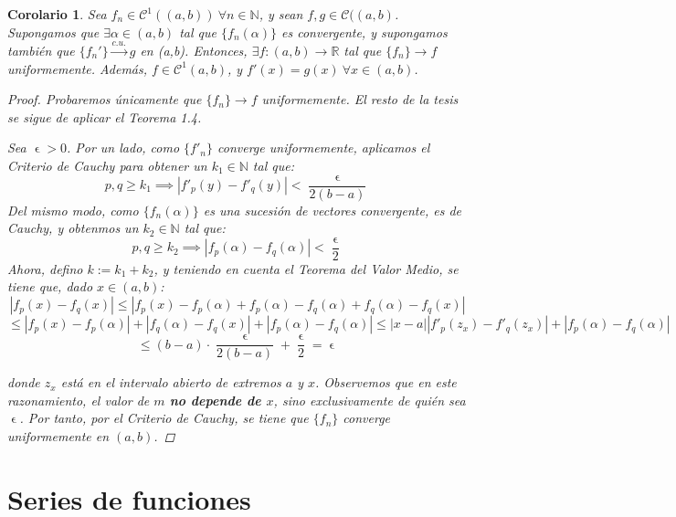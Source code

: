 \documentclass[11pt, a4paper]{article}
\let\epsilon\upvarepsilon
\newcommand{\fn}{\{f_n\}}
\theoremstyle{theorem-style}
\newtheorem{ncor}{Corolario}[section]
\theoremstyle{definition-style}
\theoremstyle{remark-style}
\theoremstyle{example-style}
\begin{document}
\begin{ncor}
	Sea $f_n\in \mathcal{C}^1((a,b)) \ \forall n \in \mathbb{N}$, y sean $f,g \in \mathcal{C}((a,b)$. Supongamos que $\exists \alpha \in (a,b)$ tal que $ \{f_n(\alpha)\}$ es convergente, y supongamos también que $\{f_n'\} \xrightarrow{c.u.} g $ en (a,b). Entonces, $\exists f: (a,b) \to \mathbb{R}$ tal que $\fn \to f$ uniformemente. Además, $f \in \mathcal{C}^1(a,b)$, y  $f'(x) = g(x)\ \forall x \in (a,b)$.

\begin{proof}
	Probaremos únicamente que $\fn \to f$ uniformemente. El resto de la tesis se sigue de aplicar el \textit{Teorema 1.4}.
	
Sea $\epsilon > 0$. Por un lado, como $\{f'_n\}$ converge uniformemente, aplicamos el \textit{Criterio de Cauchy} para obtener un $k_1 \in \mathbb{N}$ tal que: $$p,q \ge k_1 \implies |f'_p(y) - f'_q(y)| < \frac{\epsilon}{2 (b-a)}$$
Del mismo modo, como $\{f_n(\alpha)\}$ es una sucesión de vectores convergente, es de Cauchy, y obtenmos un $k_2 \in \mathbb{N}$ tal que: $$p,q \ge k_2 \implies |f_p(\alpha) - f_q(\alpha)| < \frac{\epsilon}{2}$$
Ahora, defino $k := k_1 + k_2$, y teniendo en cuenta el \textit{Teorema del Valor Medio}, se tiene que, dado $x \in (a,b)$: $$|f_p(x) - f_q(x)| \le |f_p(x) - f_p(\alpha) + f_p(\alpha) - f_q(\alpha) + f_q(\alpha) - f_q(x)|$$ $$\le |f_p(x) - f_p(\alpha)| + |f_q(\alpha) - f_q(x)| + |f_p(\alpha) - f_q(\alpha)| \le \left|x-a \right|\left| f'_p(z_x) - f'_q(z_x) \right| + |f_p(\alpha) - f_q(\alpha)|$$ $$\le (b-a) \cdot \frac{\epsilon}{2(b-a)} + \frac{\epsilon}{2} = \epsilon$$

donde $z_x$ está en el intervalo abierto de extremos $a$ y $x$. Observemos que en este razonamiento, el valor de $m$ \textbf{no depende de $x$}, sino exclusivamente de quién sea $\epsilon$. Por tanto, por el \textit{Criterio de Cauchy}, se tiene que $\{f_n\}$ converge uniformemente en $(a,b)$.
\end{proof}
	
\end{ncor}



\section{Series de funciones}
\end{document}
